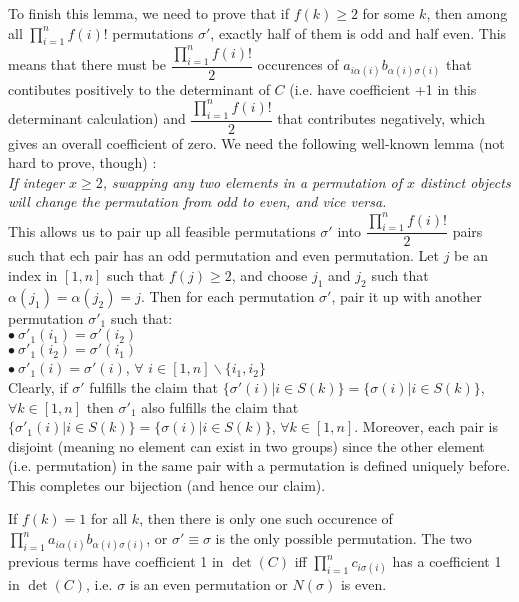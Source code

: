 \documentclass[11pt,a4paper]{article}
\begin{document}
\begin {enumerate}
To finish this lemma, we need to prove that if $f(k)\ge 2$ for some $k$, then among all $\prod_{i=1}^{n} f(i)!$ permutations $\sigma'$, exactly half of them is odd and half even. This means that there must be $\dfrac{\prod_{i=1}^{n} f(i)!}{2}$ occurences of $a_{i\alpha (i)}b_{\alpha (i)\sigma (i)}$ that contibutes positively to the determinant of $C$ (i.e. have coefficient +1 in this determinant calculation) and $\dfrac{\prod_{i=1}^{n} f(i)!}{2}$ that contributes negatively, which gives an overall coefficient of zero. We need the following well-known lemma (not hard to prove, though) :\\
\emph{\quad If integer $x\ge 2$, swapping any two elements in a permutation of $x$ distinct objects will change the permutation from odd to even, and vice versa.}\\
This allows us to pair up all feasible permutations $\sigma'$ into $\dfrac{\prod_{i=1}^{n} f(i)!}{2}$ pairs such that ech pair has an odd permutation and even permutation. Let $j$ be an index in $[1,n]$ such that $f(j)\ge 2$, and choose $j_1$ and $j_2$ such that $\alpha (j_1)=\alpha (j_2)=j$. Then for each permutation $\sigma '$, pair it up with another permutation $\sigma '_1$ such that:\\
$\bullet\ \sigma '_1 (i_1)=\sigma ' (i_2)$\\
$\bullet\ \sigma '_1 (i_2)=\sigma ' (i_1)$\\
$\bullet\ \sigma '_1 (i)=\sigma ' (i)$, $\forall$ $i\in [1,n]\backslash \{i_1, i_2\}$\\
Clearly, if $\sigma '$ fulfills the claim that $\{\sigma '(i)|i\in S(k)\}=\{\sigma (i)|i\in S(k)\}$, $\forall k\in[1,n]$ then $\sigma '_1$ also fulfills the claim that $\{\sigma '_1(i)|i\in S(k)\}=\{\sigma (i)|i\in S(k)\}$, $\forall k\in[1,n]$. Moreover, each pair is disjoint (meaning no element can exist in two groups) since the other element (i.e. permutation) in the same pair with a permutation is defined uniquely before. This completes our bijection (and hence our claim).

If $f(k)=1$ for all $k$, then there is only one such occurence of $\displaystyle\prod_{i=1}^{n}a_{i\alpha (i)}b_{\alpha (i)\sigma (i)}$, or $\sigma '\equiv\sigma$ is the only possible permutation. The two previous terms have coefficient 1 in $\det (C)$ iff $\displaystyle\prod_{i=1}^{n}c_{i\sigma (i)}$ has a coefficient 1 in $\det (C)$, i.e. $\sigma$ is an even permutation or $N(\sigma)$ is even.


\end{enumerate}
\end{document}
